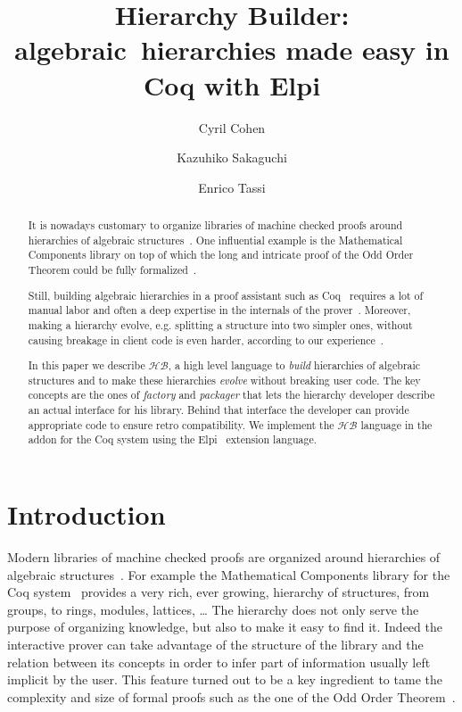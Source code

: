 \documentclass[a4paper,UKenglish,cleveref, autoref]{lipics-v2019}
\title{Hierarchy Builder: algebraic~hierarchies made easy in Coq with Elpi} %
\author{Cyril Cohen}{Inria, France}{Cyril.Cohen@inria.fr}{}{}
\author{Kazuhiko Sakaguchi}{University of Tsukuba, Japan}{sakaguchi@coins.tsukuba.ac.jp}{}{}
\author{Enrico Tassi}{Inria, France}{Enrico.Tassi@inria.fr}{}{}
\newcommand{\HB}{\ensuremath{\mathcal{HB}}}
\newcommand{\hb}{\coq{hierarchy-builder}}
\newcommand{\factory}{factory}
\newcommand{\packager}{packager}
\theoremstyle{implem}
\theoremstyle{implem}
\theoremstyle{axiom}
\theoremstyle{abscommand}
\theoremstyle{command}
\begin{document}
\maketitle

\begin{abstract}
It is nowadays customary to organize libraries of machine checked
proofs around hierarchies of algebraic
structures~\cite{10.1145/3372885.3373824,mathclasses,DBLP:journals/mics/BoldoLM15,DBLP:conf/mpc/AffeldtNS19}.
One influential example is the Mathematical Components library on top
of which the long and intricate proof of the Odd Order
Theorem could be fully formalized~\cite{DBLP:conf/itp/GonthierAABCGRMOBPRSTT13}.

Still, building algebraic hierarchies in a proof assistant such as Coq~\cite{Coq:manual}
requires a lot of manual labor and often a deep expertise in the internals of
the prover~\cite{DBLP:conf/tphol/GarillotGMR09,DBLP:conf/itp/MahboubiT13}.
Moreover, making a hierarchy evolve, e.g. splitting a structure into two
simpler ones, without causing breakage in client code is even harder,
according to our experience~\cite{KSdraft}.

In this paper we describe \HB{}, a high level language
to \emph{build} hierarchies of algebraic structures and to make these hierarchies
\emph{evolve} without breaking user code. The key concepts are the ones of
\emph{\factory{}} and \emph{\packager{}} that lets the hierarchy developer
describe an actual
interface for his library. Behind that interface the developer can provide
appropriate code to ensure retro compatibility.
We implement the \HB{} language in the \hb{} addon for the Coq
system using the Elpi~\cite{DBLP:conf/lpar/DunchevGCT15,CoqElpi}
extension language.
\end{abstract}

\section{Introduction}

Modern libraries of machine checked proofs are organized around
hierarchies of algebraic structures~\cite{10.1145/3372885.3373824,mathclasses,DBLP:journals/mics/BoldoLM15,DBLP:conf/mpc/AffeldtNS19}.
For example the Mathematical Components library for the Coq system~\cite{Coq:manual}
provides a very rich, ever growing, hierarchy of structures, from
groups, to rings, modules, lattices, \ldots{}
The hierarchy does not only serve the purpose of organizing knowledge, but
also to make it easy to find it. Indeed the interactive prover can
take advantage of the structure of the library and the relation between
its concepts in order to infer part of information usually left implicit
by the user. This feature turned out to be a key ingredient to tame
the complexity and size of formal proofs such as the one of the Odd Order
Theorem~\cite{DBLP:conf/itp/GonthierAABCGRMOBPRSTT13}.
\end{document}

